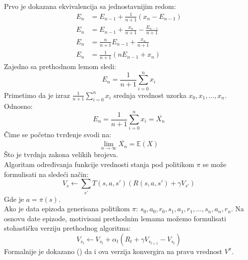 \documentclass[a4paper,fleqn,12pt]{JMThesis}
\theoremstyle{plain}
\theoremstyle{definition}
\theoremstyle{definition}
\begin{document}
\\
Prvo je dokazana ekvivalencija sa jednostavnijim redom:
\[
	\begin{split}
		E_n &= E_{n-1} + \frac{1}{n+1}(x_n - E_{n-1})\\
		E_n &= E_{n-1} + \frac{x_n}{n+1} - \frac{E_{n-1}}{n+1}\\
		E_n &= \frac{n}{n+1}E_{n-1} + \frac{x_n}{n+1}\\
		E_n &=  \frac{1}{n+1}(n E_{n-1} + x_n)
	\end{split}
\]
Zajedno sa prethodnom lemom sledi:
\[E_n = \frac{1}{n+1}\sum_{i=0}^n x_i\]
Primetimo da je izraz $\frac{1}{n+1}\sum_{i=0}^n x_i$ srednja vrednost uzorka $x_0, x_1, ... , x_n$. Odnosno:
\[E_n = \frac{1}{n+1}\sum_{i=0}^n x_i = \overline{X_n}	\]
Čime se početno tvrđenje svodi na:
\[ \lim_{n \to \infty} \overline{X_n} = \mathbb{E}(X) \]
Što je tvrdnja zakona velikih brojeva.
\medskip \\
Algoritam određivanja funkcije vrednosti stanja pod politikom $\pi$ se može formulisati na sledeći način:
\[ V_s \leftarrow \sum_{s'} T(s,a,s')(R(s,a,s') + \gamma V_{s'}) \]
Gde je $a = \pi(s)$.\\
Ako je data epizoda generisana politikom $\pi$: $s_0,a_0,r_0,s_1,a_1,r_1,...,s_n,a_n,r_n$.
Na osnovu date epizode, motivisani prethodnim lemama možemo formulisati stohastičku verziju prethodnog algoritma:
\[ V_{s_t} \leftarrow V_{s_t} + \alpha_t (R_t + \gamma V_{s_{t+1}} - V_{s_t}) \]
Formalnije je dokazano (\cite{sutton2018reinforcement}) da i ova verzija konvergira na pravu vrednost $V^{\pi}$. 
\end{document}
